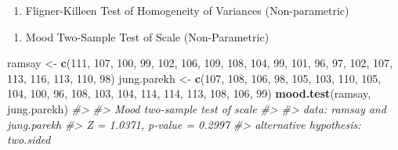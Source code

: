 \documentclass[
]{book}
\newenvironment{Shaded}{\begin{snugshade}}{\end{snugshade}}
\newcommand{\CommentTok}[1]{\textcolor[rgb]{0.56,0.35,0.01}{\textit{#1}}}
\newcommand{\DecValTok}[1]{\textcolor[rgb]{0.00,0.00,0.81}{#1}}
\newcommand{\FunctionTok}[1]{\textcolor[rgb]{0.13,0.29,0.53}{\textbf{#1}}}
\newcommand{\NormalTok}[1]{#1}
\newcommand{\OtherTok}[1]{\textcolor[rgb]{0.56,0.35,0.01}{#1}}
\newcommand{\SpecialCharTok}[1]{\textcolor[rgb]{0.81,0.36,0.00}{\textbf{#1}}}
\providecommand{\tightlist}{%
  \setlength{\itemsep}{0pt}\setlength{\parskip}{0pt}}
\begin{document}
\begin{enumerate}
\def\labelenumi{\alph{enumi}.}
\setcounter{enumi}{2}
\tightlist
\item
  Fligner-Killeen Test of Homogeneity of Variances (Non-parametric)
\end{enumerate}

\begin{Shaded}
\end{Shaded}

\begin{enumerate}
\def\labelenumi{\alph{enumi}.}
\setcounter{enumi}{3}
\tightlist
\item
  Mood Two-Sample Test of Scale (Non-Parametric)
\end{enumerate}

\begin{Shaded}
\begin{Highlighting}[]
\NormalTok{ramsay }\OtherTok{\textless{}{-}} \FunctionTok{c}\NormalTok{(}\DecValTok{111}\NormalTok{, }\DecValTok{107}\NormalTok{, }\DecValTok{100}\NormalTok{, }\DecValTok{99}\NormalTok{, }\DecValTok{102}\NormalTok{, }\DecValTok{106}\NormalTok{, }\DecValTok{109}\NormalTok{, }\DecValTok{108}\NormalTok{, }\DecValTok{104}\NormalTok{, }\DecValTok{99}\NormalTok{,}
            \DecValTok{101}\NormalTok{, }\DecValTok{96}\NormalTok{, }\DecValTok{97}\NormalTok{, }\DecValTok{102}\NormalTok{, }\DecValTok{107}\NormalTok{, }\DecValTok{113}\NormalTok{, }\DecValTok{116}\NormalTok{, }\DecValTok{113}\NormalTok{, }\DecValTok{110}\NormalTok{, }\DecValTok{98}\NormalTok{)}
\NormalTok{jung.parekh }\OtherTok{\textless{}{-}} \FunctionTok{c}\NormalTok{(}\DecValTok{107}\NormalTok{, }\DecValTok{108}\NormalTok{, }\DecValTok{106}\NormalTok{, }\DecValTok{98}\NormalTok{, }\DecValTok{105}\NormalTok{, }\DecValTok{103}\NormalTok{, }\DecValTok{110}\NormalTok{, }\DecValTok{105}\NormalTok{, }\DecValTok{104}\NormalTok{,}
            \DecValTok{100}\NormalTok{, }\DecValTok{96}\NormalTok{, }\DecValTok{108}\NormalTok{, }\DecValTok{103}\NormalTok{, }\DecValTok{104}\NormalTok{, }\DecValTok{114}\NormalTok{, }\DecValTok{114}\NormalTok{, }\DecValTok{113}\NormalTok{, }\DecValTok{108}\NormalTok{, }\DecValTok{106}\NormalTok{, }\DecValTok{99}\NormalTok{)}
\FunctionTok{mood.test}\NormalTok{(ramsay, jung.parekh)}
\CommentTok{\#\textgreater{} }
\CommentTok{\#\textgreater{}  Mood two{-}sample test of scale}
\CommentTok{\#\textgreater{} }
\CommentTok{\#\textgreater{} data:  ramsay and jung.parekh}
\CommentTok{\#\textgreater{} Z = 1.0371, p{-}value = 0.2997}
\CommentTok{\#\textgreater{} alternative hypothesis: two.sided}
\end{Highlighting}
\end{Shaded}
\end{document}
